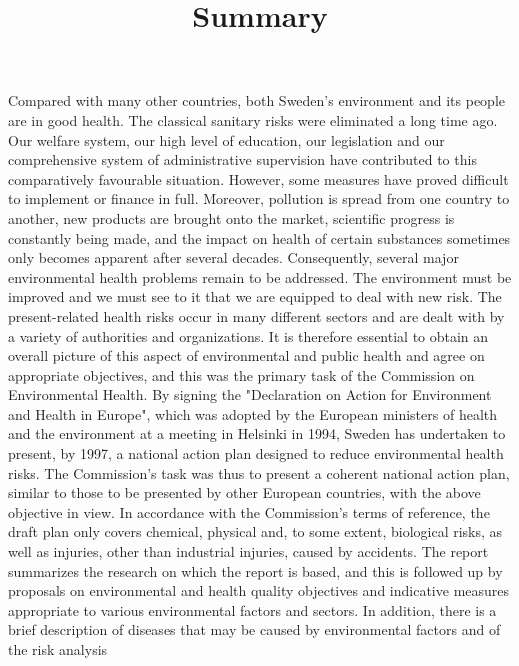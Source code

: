 \title{
Summary
}
Compared with many other countries, both Sweden's environment and its people are in good health. The classical sanitary risks were eliminated a long time ago. Our welfare system, our high level of education, our legislation and our comprehensive system of administrative supervision have contributed to this comparatively favourable situation. However, some measures have proved difficult to implement or finance in full. Moreover, pollution is spread from one country to another, new products are brought onto the market, scientific progress is constantly being made, and the impact on health of certain substances sometimes only becomes apparent after several decades. Consequently, several major environmental health problems remain to be addressed. The environment must be improved and we must see to it that we are equipped to deal with new risk.
The present-related health risks occur in many different sectors and are dealt with by a variety of authorities and organizations. It is therefore essential to obtain an overall picture of this aspect of environmental and public health and agree on appropriate objectives, and this was the primary task of the Commission on Environmental Health. By signing the "Declaration on Action for Environment and Health in Europe", which was adopted by the European ministers of health and the environment at a meeting in Helsinki in 1994, Sweden has undertaken to present, by 1997, a national action plan designed to reduce environmental health risks.
The Commission's task was thus to present a coherent national action plan, similar to those to be presented by other European countries, with the above objective in view. In accordance with the Commission's terms of reference, the draft plan only covers chemical, physical and, to some extent, biological risks, as well as injuries, other than industrial injuries, caused by accidents. The report summarizes the research on which the report is based, and this is followed up by proposals on environmental and health quality objectives and indicative measures appropriate to various environmental factors and sectors. In addition, there is a brief description of diseases that may be caused by environmental factors and of the risk analysis

